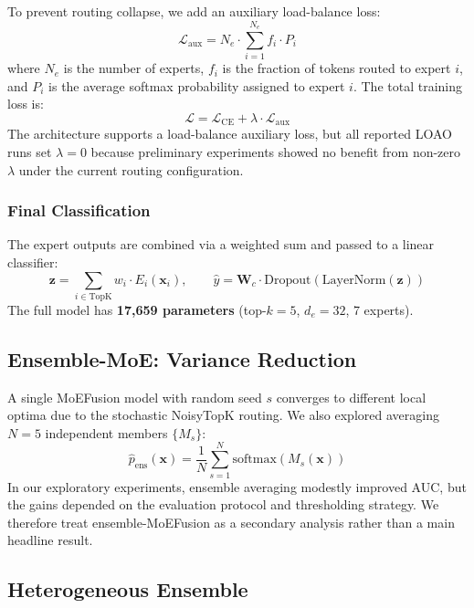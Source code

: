 ﻿\documentclass[sigconf,review,anonymous]{acmart}
\newcommand{\sys}{MoEFusion}
\begin{document}
To prevent routing collapse, we add an auxiliary load-balance loss:
\begin{equation}
\mathcal{L}_{\text{aux}} = N_e \cdot \sum_{i=1}^{N_e} f_i \cdot P_i
\end{equation}
where $N_e$ is the number of experts, $f_i$ is the fraction of tokens routed to
expert $i$, and $P_i$ is the average softmax probability assigned to expert $i$.
The total training loss is:
\begin{equation}
\mathcal{L} = \mathcal{L}_{\text{CE}} + \lambda \cdot \mathcal{L}_{\text{aux}}
\end{equation}
The architecture supports a load-balance auxiliary loss, but all reported LOAO
runs set $\lambda{=}0$ because preliminary experiments showed no benefit from
non-zero $\lambda$ under the current routing configuration.

\subsubsection{Final Classification}

The expert outputs are combined via a weighted sum and passed to a linear
classifier:
\begin{equation}
\mathbf{z} = \sum_{i \in \mathrm{TopK}} w_i \cdot E_i(\mathbf{x}_i), \qquad
\hat{y} = \mathbf{W}_c \cdot \mathrm{Dropout}(\mathrm{LayerNorm}(\mathbf{z}))
\end{equation}
The full model has \textbf{17,659 parameters} (top-$k{=}5$, $d_e{=}32$,
7 experts).

\subsection{Ensemble-MoE: Variance Reduction}
\label{sec:ensemble}

A single \sys{} model with random seed $s$ converges to different local optima
due to the stochastic NoisyTopK routing.
We also explored averaging $N{=}5$ independent members $\{M_s\}$:
\begin{equation}
\hat{p}_{\text{ens}}(\mathbf{x}) =
\frac{1}{N} \sum_{s=1}^{N} \mathrm{softmax}(M_s(\mathbf{x}))
\end{equation}
In our exploratory experiments, ensemble averaging modestly improved AUC, but
the gains depended on the evaluation protocol and thresholding strategy.
We therefore treat ensemble-\sys{} as a secondary analysis rather than a main
headline result.

\subsection{Heterogeneous Ensemble}
\label{sec:hetero}
\end{document}
